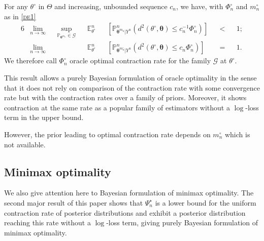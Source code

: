 \begin{thm}\label{thm1}
For any $\theta^{\circ}$ in $\Theta$ and increasing, unbounded sequence $c_{n}$, we have, with $\Phi_{n}^{\circ}$ and $m_{n}^{\circ}$ as in \textsc{\cref{de1}}
\begin{alignat*}{6}
& \lim\limits_{n \rightarrow \infty} &&\sup\limits_{\mathds{P}_{\boldsymbol{\theta}^{m_{n}}}\in \mathcal{G}} && \mathds{E}_{\theta^{\circ}}^{n}&&\left[\mathds{P}_{\boldsymbol{\theta}^{m_{n}}\vert Y^{n}}^{n}\left(d^{2}\left(\theta^{\circ}, \boldsymbol{\theta}\right) \leq c_{n}^{-1}\Phi_{n}^{\circ}\right)\right] && < && 1;\\
& \lim\limits_{n \rightarrow \infty} && && \mathds{E}_{\theta^{\circ}}^{n}&&\left[\mathds{P}_{\boldsymbol{\theta}^{m_{n}^{\circ}}\vert Y^{n}}^{n}\left(d^{2}\left(\theta^{\circ}, \boldsymbol{\theta}\right) \leq c_{n} \Phi_{n}^{\circ} \right)\right] &&=&& 1.
\end{alignat*}
We therefore call $\Phi_{n}^{\circ}$ oracle optimal contraction rate for the family $\mathcal{G}$ at $\theta^{\circ}$.
\end{thm}

This result allows a purely Bayesian formulation of oracle optimality in the sense that it does not rely on comparison of the contraction rate with some convergence rate but with the contraction rates over a family of priors.
Moreover, it shows contraction at the same rate as a popular family of estimators without a $\log$-loss term in the upper bound.

However, the prior leading to optimal contraction rate depends on $m_{n}^{\circ}$ which is not available.

\subsection{Minimax optimality}\label{3.2}
We also give attention here to Bayesian formulation of minimax optimality.
The second major result of this paper shows that $\Psi_{n}^{\star}$ is a lower bound for the uniform contraction rate of posterior distributions and exhibit a posterior distribution reaching this rate without a $\log$-loss term, giving purely Bayesian formulation of minimax optimality.

